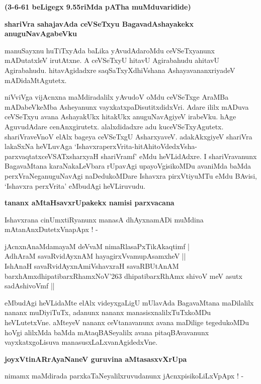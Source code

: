 {\bf (3-6-61 beLigegx 9.55riMda pATha muMduvaridide)}

{\bigskip
\noindent
{\large\bf shariVra sahajavAda ceVSeTxyu BagavadAshayakekx anuguNavAgabeVku}}\label{80}
\medskip

\noindent
manuSayxnu huTiTxyAda baLika yAvudAdaroMdu ceVSeTxyanunx mADutatxleV irutAtxne. A ceV\-SeTxyU hitavU Agirabahudu ahitavU Agirabahudu. hitavAgidadxre saqSaTxyXdhiVshana AshayavananxriyadeV mADi\-daMtAgutetx. 

niVviVga vijAcnxna maMdiradalilx yAvudoV oMdu ceVSeTxge AraMBa mADabeVkeMba Ashe\-yanunx vayxkatxpaDisutitxdidxVri. Adare ililx mADuva ceVSeTxyu avana AshayakUkx hitakUkx anuguNavAgiyeV irabeVku. hAge AguvudAdare cenAnxgirutetx. alalxdidadxre adu kuceVSeTxyAgutetx. shariVraveVnoV elAlx bageya ceVSeTxgU AsharxyaveV. adakAkxgiyeV shariVra lakaSxNa heVLuvAga `IshavxraperxVrita-hitAhitoVdedxVsha-\-parxvaqtatxceVSATxsharxyaH shariVramf'\label{80a} eMdu heVLidAdxre. I shariVravanunx BagavaMtana karaNakaLeVbara rUpavAgi upayoVgisikoMDu avaniMda baMda perxVraNeganuguNavAgi naDedukoMDare Ishavxra pirxVtiyuMTu eMdu BAvisi, `Ishavxra perxVrita' eMbudAgi heVLiruvudu.

{\bigskip
\noindent
{\large\bf tananx aMtaHsavxrUpakekx namisi parxvacana}}\label{80b}
\medskip

\noindent
Ishavxrana cinUmxtiRyanunx manasA dhAyxnamADi muMdina mAtanAnxDutetxVnapApx ! -

\begin{shloka}
jAcnxnAnaMdamayaM deVvaM nimaRlasaPxTikAkaqtimf |\\\label{80c}
AdhAraM savaRvidAyxnAM hayagirxVvamupAsamxheV ||\\

IshAnaH savaRvidAyxnAmiVshavxraH savaRBUtAnAM\\\label{80d}
barxhAmxdhipatibarxRhamxNoV\char'263 dhipatibarxRhAmx shivoV meV asutx sadAshivoVmf ||
\end{shloka}

eMbudAgi heVLidaMte elAlx videyxgaLigU mUlavAda BagavaMtana maDilalilx nananx muDiyiTuTx, adanunx nananx manasisxnalilxTuTxkoMDu heVLutetxVne. aMteyeV nananx ceVtanavanunx avana maDilige tegedu\-koMDu hoVgi alilxMda baMda mAtaqBASeyalilx avana pitaqBAvavanunx vayxkatxgoLisuva manasusxLaLxva\-nAgidedxVne.

{\bigskip
\noindent
{\large\bf joyxVtinARrAyaNaneV guruvina aMtasasxvXrUpa}}\label{80e}
\medskip

nimamx maMdirada parxkaTaNeyalilxruvudanunx jAcnxpisikoLiLxVpApx ! - 

